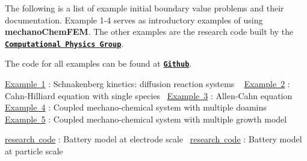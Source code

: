 The following is a list of example initial boundary value problems and their documentation. Example 1-\/4 serves as introductory examples of using {\bfseries{mechano\+Chem\+F\+EM}}. The other examples are the research code built by the \href{http://umich.edu/~compphys/index.html}{\texttt{ {\bfseries{Computational Physics Group}}}}.

The code for all examples can be found at \href{https://github.com/mechanoChem/mechanoChemFEM/tree/example}{\texttt{ {\bfseries{Github}}}}.

\mbox{\hyperlink{diffusion_reaction}{Example 1}} \+: Schnakenberg kinetics\+: diffusion reaction systems ~\newline
 \mbox{\hyperlink{_cahn_hilliard}{Example 2}} \+: Cahn-\/\+Hilliard equation with single species~\newline
 \mbox{\hyperlink{_allen__cahn}{Example 3}} \+: Allen-\/\+Cahn equation ~\newline
 \mbox{\hyperlink{growth}{Example 4}} \+: Coupled mechano-\/chemical system with multiple doamins~\newline
 \mbox{\hyperlink{brain_morph}{Example 5}} \+: Coupled mechano-\/chemical system with multiple growth model~\newline
 



\mbox{\hyperlink{battery_electrode_scale}{research code}} \+: Battery model at electrode scale~\newline
 \mbox{\hyperlink{battery_particle}{research code}} \+: Battery model at particle scale~\newline
